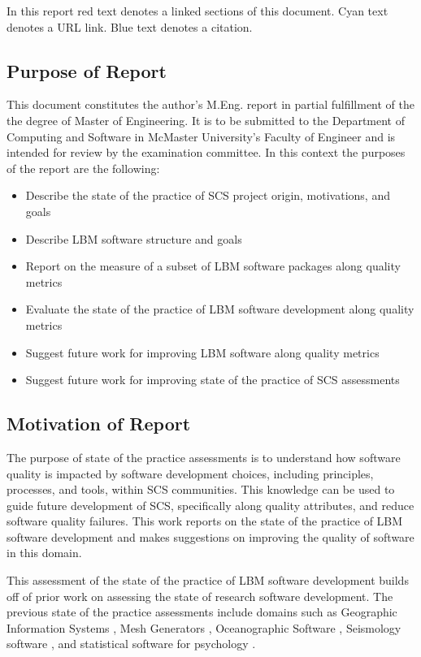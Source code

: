 \documentclass[12pt, notitlepage]{article}
\begin{document}
In this report red text denotes a linked sections of this document. Cyan text denotes a URL link. Blue text denotes a citation.

\subsection{Purpose of Report}

This document constitutes the author's M.Eng. report in partial fulfillment of the the degree of Master of Engineering. It is to be submitted to the Department of Computing and Software in McMaster University's Faculty of Engineer and is intended for review by the examination committee. In this context the purposes of the report are the following:

\begin{itemize}
	\item Describe the state of the practice of SCS project origin, motivations, and goals
	\item Describe LBM software structure and goals
	\item Report on the measure of a subset of LBM software packages along quality metrics
	\item Evaluate the state of the practice of LBM software development along quality metrics
	\item Suggest future work for improving LBM software along quality metrics
	\item Suggest future work for improving state of the practice of SCS assessments
\end{itemize}

\subsection{Motivation of Report}

The purpose of state of the practice assessments is to understand how software quality is impacted by software development choices, including principles, processes, and tools, within SCS communities. This knowledge can be used to guide future development of SCS, specifically along quality attributes, and reduce software quality failures. This work reports on the state of the practice of LBM software development and makes suggestions on improving the quality of software in this domain.

This assessment of the state of the practice of LBM software development builds off of prior work on assessing the state of research software development. The previous state of the practice assessments include domains such as Geographic Information Systems \citep{SmithEtAl2018_arXivGIS}, Mesh Generators \citep{SmithEtAl2016}, Oceanographic Software \citep{smith2015state}, Seismology software \citep{SmithEtAl2018}, and statistical software for psychology \citep{SmithEtAl2018_StatSoft}. 
\end{document}
